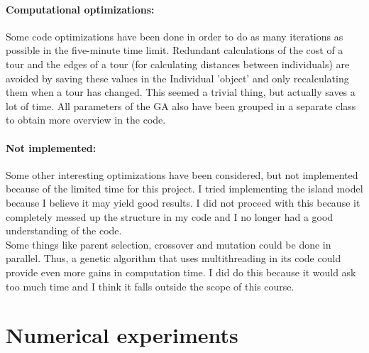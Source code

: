 \documentclass[a4paper,10pt]{article}
\newcommand{\ReplaceMe}[1]{{\color{blue}#1}}
\newcommand{\RemoveMe}[1]{{\color{purple}#1}}
\begin{document}
\paragraph{Computational optimizations:} Some code optimizations have been done in order to do as many iterations as possible in the five-minute time limit. Redundant calculations of the cost of a tour and the edges of a tour (for calculating distances between individuals) are avoided by saving these values in the Individual 'object' and only recalculating them when a tour has changed. This seemed a trivial thing, but actually saves a lot of time. All parameters of the GA also have been grouped in a separate class to obtain more overview in the code. 

\paragraph{Not implemented:} Some other interesting optimizations have been considered, but not implemented because of the limited time for this project. I tried implementing the island model because I believe it may yield good results. I did not proceed with this because it completely messed up the structure in my code and I no longer had a good understanding of the code. \\

Some things like parent selection, crossover and mutation could be done in parallel. Thus, a genetic algorithm that uses multithreading in its code could provide even more gains in computation time. I did do this because it would ask too much time and I think it falls outside the scope of this course. 



\section{Numerical experiments}

\end{document}
